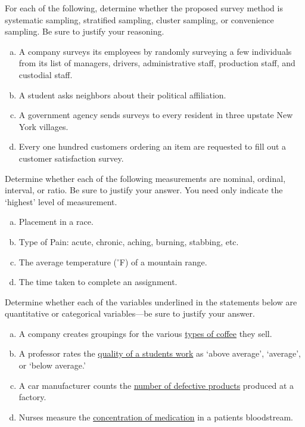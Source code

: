 \documentclass[11pt,letterpaper]{article}
\begin{document}

 For each of the following, determine whether the proposed survey method is systematic sampling, stratified sampling, cluster sampling, or convenience sampling. Be sure to justify your reasoning. 
	\begin{enumerate}[(a)]
	\item A company surveys its employees by randomly surveying a few individuals from its list of managers, drivers, administrative staff, production staff, and custodial staff. 
	\item A student asks neighbors about their political affiliation. 
	\item A government agency sends surveys to every resident in three upstate New York villages. 
	\item Every one hundred customers ordering an item are requested to fill out a customer satisfaction survey. 
	\end{enumerate}



\newpage



 Determine whether each of the following measurements are nominal, ordinal, interval, or ratio. Be sure to justify your answer. You need only indicate the `highest' level of measurement. 
	\begin{enumerate}[(a)]
	\item Placement in a race. 
	\item Type of Pain: acute, chronic, aching, burning, stabbing, etc.
	\item The average temperature ($^\circ$F) of a mountain range. 
	\item The time taken to complete an assignment. 
	\end{enumerate}



\newpage



 Determine whether each of the variables underlined in the statements below are quantitative or categorical variables---be sure to justify your answer. 
	\begin{enumerate}[(a)]
	\item A company creates groupings for the various \underline{types of coffee} they sell. 
	\item A professor rates the \underline{quality of a students work} as `above average', `average', or `below average.' 
	\item A car manufacturer counts the \underline{number of defective products} produced at a factory.  
	\item Nurses measure the \underline{concentration of medication} in a patients bloodstream. 
	\end{enumerate}
\end{document}

